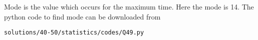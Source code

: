  Mode is the value which occurs for the maximum time. Here the mode is 14.
 The python code to find mode can be downloaded from
\begin{lstlisting}
solutions/40-50/statistics/codes/Q49.py
\end{lstlisting}
